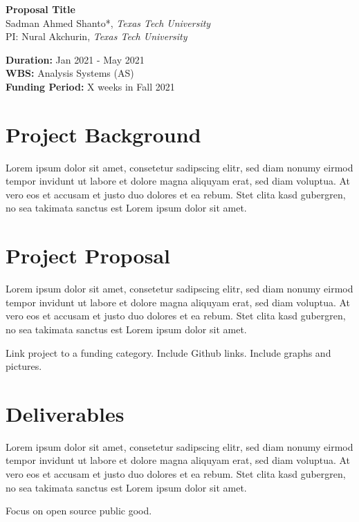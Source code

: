\documentclass[12pt]{article}
\begin{document}
\begin{center}
    \huge{\textbf{Proposal Title}} \\
    \Large{Sadman Ahmed Shanto*, \textit{Texas Tech University}} \\
    \Large{PI: Nural Akchurin, \textit{Texas Tech University}}
\end{center}


\flushleft
\large{
\textbf{Duration:} Jan 2021 - May 2021 \\
\textbf{WBS:} Analysis Systems (AS) \\
\textbf{Funding Period:} X weeks in Fall 2021}

\section{Project Background}
Lorem ipsum dolor sit amet, consetetur sadipscing elitr, sed diam nonumy eirmod tempor invidunt ut labore et dolore magna aliquyam erat, sed diam voluptua. At vero eos et accusam et justo duo dolores et ea rebum. Stet clita kasd gubergren, no sea takimata sanctus est Lorem ipsum dolor sit amet.

\section{Project Proposal}

Lorem ipsum dolor sit amet, consetetur sadipscing elitr, sed diam nonumy eirmod tempor invidunt ut labore et dolore magna aliquyam erat, sed diam voluptua. At vero eos et accusam et justo duo dolores et ea rebum. Stet clita kasd gubergren, no sea takimata sanctus est Lorem ipsum dolor sit amet.

Link project to a funding category. Include Github links. Include graphs and pictures.

\section{Deliverables}
Lorem ipsum dolor sit amet, consetetur sadipscing elitr, sed diam nonumy eirmod tempor invidunt ut labore et dolore magna aliquyam erat, sed diam voluptua. At vero eos et accusam et justo duo dolores et ea rebum. Stet clita kasd gubergren, no sea takimata sanctus est Lorem ipsum dolor sit amet.

Focus on open source public good.
\end{document}
